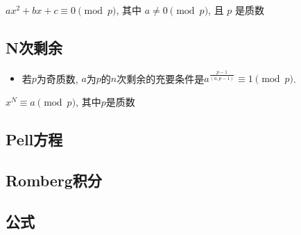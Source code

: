 \documentclass[landscape, twocolumn, 8pt, a4paper, twoside]{extarticle}
\begin{document}
    $ax^2 + bx + c \equiv 0 \pmod{p}$, 其中 $a \ne 0 \pmod{p}$, 且 $p$ 是质数
    
  
  \subsection{N次剩余}
    \begin{itemize}
    \item 若$p$为奇质数, $a$为$p$的$n$次剩余的充要条件是$a^{\frac{p - 1}{(a, p - 1)}} \equiv 1 \pmod{p}$.
    \end{itemize}
    $x^N \equiv a \pmod{p}$, 其中$p$是质数
    

  \subsection{Pell方程}
    

  \subsection{Romberg积分}
    

  \subsection{公式}
\end{document}
